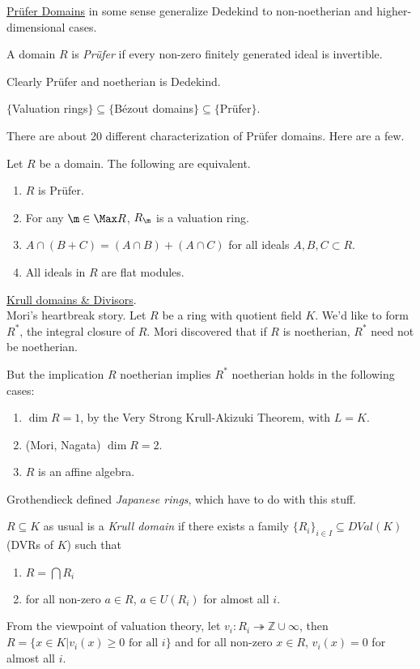  \underline{Pr\"ufer Domains} in some sense generalize Dedekind to non-noetherian and
 higher-dimensional cases.
 \begin{definition}
   A domain $R$ is \emph{Pr\"ufer} if every non-zero finitely generated ideal is
   invertible.
 \end{definition}
 Clearly Pr\"ufer and noetherian is Dedekind.
 \begin{example}
   $\{$Valuation rings$\}\subseteq \{$B\'ezout
     domains$\}\subseteq\{$Pr\"ufer$\}$.
 \end{example}
 There are about 20 different characterization of Pr\"ufer domains. Here are a few.
 \begin{theorem}
   Let $R$ be a domain. The following are equivalent.
   \begin{enumerate}
     \item $R$ is Pr\"ufer.
     \item For any $\m\in \Max R$, $R_\m$ is a valuation ring.
     \item $A\cap (B+C)=(A\cap B)+(A\cap C)$ for all ideals $A,B,C\subset R$.
     \item All ideals in $R$ are flat modules.
   \end{enumerate}
 \end{theorem}

 \underline{Krull domains \& Divisors}.\\
 Mori's heartbreak story. Let $R$ be a ring with quotient field $K$. We'd like to form
 $R^*$, the integral closure of $R$. Mori discovered that if $R$ is noetherian, $R^*$
 need not be noetherian.

 But the implication $R$ noetherian implies $R^*$ noetherian holds in the following
 cases:
 \begin{enumerate}
   \item $\dim R=1$, by the Very Strong Krull-Akizuki Theorem, with $L=K$.
   \item (Mori, Nagata) $\dim R=2$.
   \item $R$ is an affine algebra.
 \end{enumerate}
 Grothendieck defined \emph{Japanese rings}, which have to do with this stuff.
 \begin{definition}
   $R\subseteq K$ as usual is a \emph{Krull domain} if there exists a family
   $\{R_i\}_{i\in I}\subseteq DVal(K)$ (DVRs of $K$) such that
   \begin{enumerate}
     \item $R = \bigcap R_i$
     \item for all non-zero $a\in R$, $a\in U(R_i)$ for almost all $i$.
   \end{enumerate}
 \end{definition}
 From the viewpoint of valuation theory, let $v_i:R_i\twoheadrightarrow \mathbb{Z}\cup \infty$,
 then $R=\{x\in K|v_i(x)\ge 0 \text{ for all }i\}$ and for all non-zero $x\in R$,
 $v_i(x)=0$ for almost all $i$.


